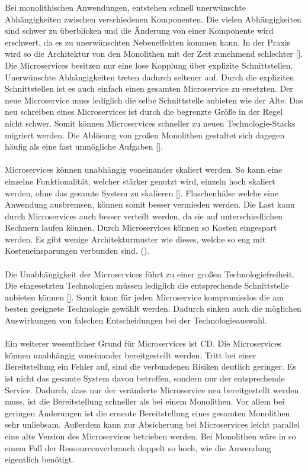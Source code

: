 Bei monolithischen Anwendungen, entstehen schnell unerwünschte Abhängigkeiten zwischen verschiedenen Komponenten. Die vielen Abhängigkeiten sind schwer zu überblicken und die Änderung von einer Komponente wird erschwert, da es zu unerwünschten Nebeneffekten kommen kann. In der Praxis wird so die Architektur von den Monolithen mit der Zeit zunehmend schlechter [\cite[S. 3]{wolffMicroservices2018}]. Die Microservices besitzen nur eine lose Kopplung über explizite Schnittstellen. Unerwünschte Abhängigkeiten treten dadurch seltener auf. Durch die expliziten Schnittstellen ist es auch einfach einen gesamten Microservice zu ersetzten. Der neue Microservice muss lediglich die selbe Schnittstelle anbieten wie der Alte. Das neu schreiben eines Microservices ist durch die begrenzte Größe in der Regel nicht schwer. Somit können Microservices schneller zu neuen Technologie-Stacks migriert werden. Die Ablösung von großen Monolithen gestaltet sich dagegen häufig als eine fast unmögliche Aufgaben [\cite[S. 29]{newmanMicroservices2015}]. \\
\\
Microservices können unabhängig voneinander skaliert werden. So kann eine einzelne Funktionalität, welcher stärker genutzt wird, einzeln hoch skaliert werden, ohne das gesamte System zu skalieren [\cite[S. 5]{wolffMicroservices2018}]. Flaschenhälse welche eine Anwendung ausbremsen, können somit besser vermieden werden. Die Last kann durch Microservices auch besser verteilt werden, da sie auf unterschiedlichen Rechnern laufen können. Durch Microservices können so Kosten eingespart werden. Es gibt wenige Architekturmuster wie dieses, welche so eng mit Kosteneinsparungen verbunden sind. (\cite[S. 27]{newmanMicroservices2015}). \\
\\
Die Unabhängigkeit der Microservices führt zu einer großen Technologiefreiheit. Die eingesetzten Technologien müssen lediglich die entsprechende Schnittstelle anbieten können [\cite[S. 5]{wolffMicroservices2018}]. Somit kann für jeden Microservice kompromisslos die am besten geeignete Technologie gewählt werden. Dadurch sinken auch die möglichen Auswirkungen von falschen Entscheidungen bei der Technologieauswahl. \\
\\
Ein weiterer wesentlicher Grund für Microservices ist \ac{CD}. Die Microservices können unabhängig voneinander bereitgestellt werden. Tritt bei einer Bereitstellung ein Fehler auf, sind die verbundenen Risiken deutlich geringer. Es ist nicht das gesamte System davon betroffen, sondern nur der entsprechende Service. Dadurch, dass nur der veränderte Microservice neu bereitgestellt werden muss, ist die Bereitstellung schneller als bei einem Monolithen. Vor allem bei geringen Änderungen ist die erneute Bereitstellung eines gesamten Monolithen sehr unliebsam. Außerdem kann zur Absicherung bei Microservices leicht parallel eine alte Version des Microservices betrieben werden. Bei Monolithen wäre in so einem Fall der Ressourcenverbrauch doppelt so hoch, wie die Anwendung eigentlich benötigt.

